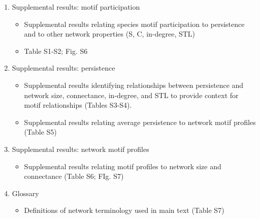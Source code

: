 \documentclass[12pt]{article}
\begin{document}
\begin{spacing}{2.0}
{\begin{spacing}{1.0}
\begin{enumerate}
            \begin{itemize}
                \item GLMs summarising how the relationship between motif participation and persistence varies over S and C, to complement the within-network results presented in the main text (Eqn. S7)
                \item Plots of these GLMs for each motif (Figs. S2-S5)
            \end{itemize}    


        \item Supplemental results: motif participation 
            \begin{itemize}
                \item Supplemental results relating species motif participation to persistence and to other network properties (S, C, in-degree, STL)
                \item Table S1-S2; Fig. S6
            \end{itemize}

    
        \item Supplemental results: persistence

            \begin{itemize}
                \item Supplemental results identifying relationships between persistence and network size, connectance, in-degree, and STL to provide context for motif relationships (Tables S3-S4).
                \item Supplemental results relating average persistence to network motif profiles (Table S5)
            \end{itemize}    

    
        \item Supplemental results: network motif profiles

            \begin{itemize}
                \item Supplemental results relating motif profiles  to network size and connectance (Table S6; FIg. S7)
            \end{itemize}


        \item Glossary    

            \begin{itemize}
                \item Definitions of network terminology used in main text (Table S7)
            \end{itemize}



\end{enumerate}
\end{spacing}}
\end{spacing}
\end{document}
